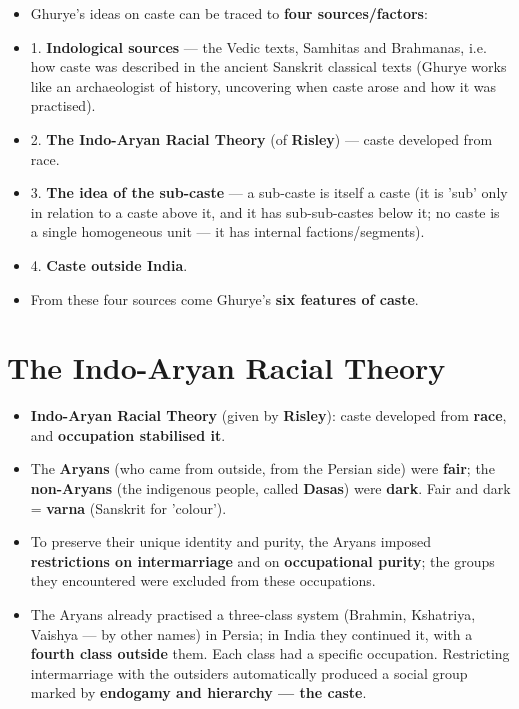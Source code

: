 \begin{KeyConcept}
\begin{itemize}
\item Ghurye's ideas on caste can be traced to \textbf{four sources/factors}:
\item 1. \textbf{Indological sources} --- the Vedic texts, Samhitas and Brahmanas, i.e. how caste was described in the ancient Sanskrit classical texts (Ghurye works like an archaeologist of history, uncovering when caste arose and how it was practised).
\item 2. \textbf{The Indo-Aryan Racial Theory} (of \textbf{Risley}) --- caste developed from race.
\item 3. \textbf{The idea of the sub-caste} --- a sub-caste is itself a caste (it is 'sub' only in relation to a caste above it, and it has sub-sub-castes below it; no caste is a single homogeneous unit --- it has internal factions/segments).
\item 4. \textbf{Caste outside India}.
\item From these four sources come Ghurye's \textbf{six features of caste}.
\end{itemize}
\end{KeyConcept}

\section{The Indo-Aryan Racial Theory}

\begin{KeyConcept}
\begin{itemize}
\item \textbf{Indo-Aryan Racial Theory} (given by \textbf{Risley}): caste developed from \textbf{race}, and \textbf{occupation stabilised it}.
\item The \textbf{Aryans} (who came from outside, from the Persian side) were \textbf{fair}; the \textbf{non-Aryans} (the indigenous people, called \textbf{Dasas}) were \textbf{dark}. Fair and dark = \textbf{varna} (Sanskrit for 'colour').
\item To preserve their unique identity and purity, the Aryans imposed \textbf{restrictions on intermarriage} and on \textbf{occupational purity}; the groups they encountered were excluded from these occupations.
\item The Aryans already practised a three-class system (Brahmin, Kshatriya, Vaishya --- by other names) in Persia; in India they continued it, with a \textbf{fourth class outside} them. Each class had a specific occupation. Restricting intermarriage with the outsiders automatically produced a social group marked by \textbf{endogamy and hierarchy --- the caste}.
\end{itemize}
\end{KeyConcept}

